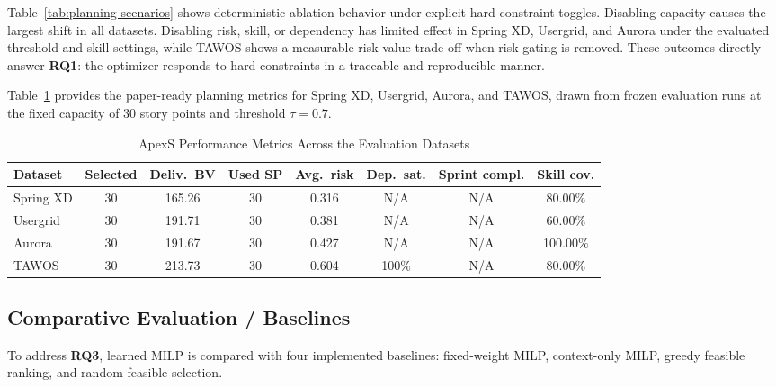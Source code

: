\documentclass[conference]{IEEEtran}
\begin{document}
Table~\ref{tab:planning-scenarios} shows deterministic ablation behavior under
explicit hard-constraint toggles. Disabling capacity causes the largest shift in all
datasets. Disabling risk, skill, or dependency has limited effect in Spring XD,
Usergrid, and Aurora under the evaluated threshold and skill settings, while TAWOS
shows a measurable risk-value trade-off when risk gating is removed. These outcomes
directly answer \textbf{RQ1}: the optimizer responds to hard constraints in a
traceable and reproducible manner.

Table~\ref{tab:performance-metrics} provides the paper-ready planning metrics for
Spring XD, Usergrid, Aurora, and TAWOS, drawn from frozen evaluation runs at the
fixed capacity of 30 story points and threshold $\tau=0.7$.

\begin{table}[t]
	\caption{ApexS Performance Metrics Across the Evaluation Datasets}
	\label{tab:performance-metrics}
	\centering\scriptsize
	\begin{tabular}{lccccccc}
		\toprule
		Dataset   & Selected & Deliv.\ BV & Used SP & Avg.\ risk & Dep.\ sat. & Sprint compl. & Skill cov. \\
		\midrule
		Spring XD & 30       & 165.26     & 30      & 0.316      & N/A        & N/A           & 80.00\%    \\
		Usergrid  & 30       & 191.71     & 30      & 0.381      & N/A        & N/A           & 60.00\%    \\
		Aurora    & 30       & 191.67     & 30      & 0.427      & N/A        & N/A           & 100.00\%   \\
		TAWOS     & 30       & 213.73     & 30      & 0.604      & 100\%      & N/A           & 80.00\%    \\
		\bottomrule
	\end{tabular}
\end{table}

\subsection{Comparative Evaluation / Baselines}

To address \textbf{RQ3}, learned MILP is compared with four implemented baselines:
fixed-weight MILP, context-only MILP, greedy feasible ranking, and random feasible
selection.
\end{document}
